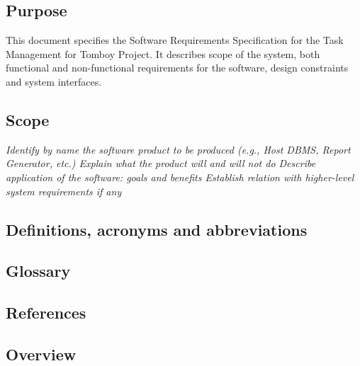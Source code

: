 \subsection{Purpose}
\label{intro:purpose}
This document specifies the Software Requirements Specification for the Task Management for Tomboy Project. 
It describes scope of the system, both functional and non-functional requirements for
the software, design constraints and system interfaces.


\subsection{Scope}
\label{intro:scope}
\textit{Identify by name the software product to be produced (e.g., Host DBMS, Report Generator, etc.)
Explain what the product will and will not do
Describe application of the software: goals and benefits
Establish relation with higher-level system requirements if any}

\subsection{Definitions, acronyms and abbreviations}
\label{intro:definitions}

\begin{objects}
\end{objects}


\subsection{Glossary}
\label{intro:glossary}

\begin{objects}
\end{objects}



\subsection{References}
\label{intro:references}

\subsection{Overview}
\label{intro:overview}
